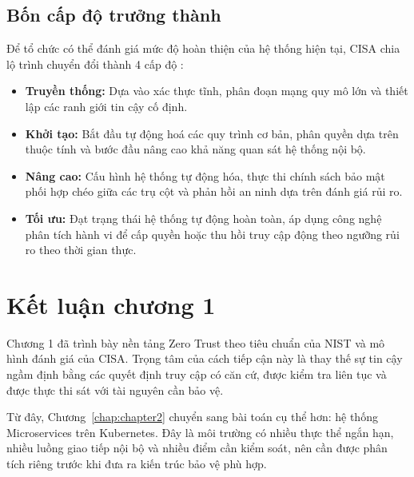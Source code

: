 \subsection{Bốn cấp độ trưởng thành}

Để tổ chức có thể đánh giá mức độ hoàn thiện của hệ thống hiện tại, CISA chia lộ trình chuyển đổi thành 4 cấp độ \parencite{cisa_ztmm2023}:
\begin{itemize}[itemsep=6pt, parsep=0pt]
    \item \textbf{Truyền thống:} Dựa vào xác thực tĩnh, phân đoạn mạng quy mô lớn và thiết lập các ranh giới tin cậy cố định.
    \item \textbf{Khởi tạo:} Bắt đầu tự động hoá các quy trình cơ bản, phân quyền dựa trên thuộc tính và bước đầu nâng cao khả năng quan sát hệ thống nội bộ.
    \item \textbf{Nâng cao:} Cấu hình hệ thống tự động hóa, thực thi chính sách bảo mật phối hợp chéo giữa các trụ cột và phản hồi an ninh dựa trên đánh giá rủi ro.
    \item \textbf{Tối ưu:} Đạt trạng thái hệ thống tự động hoàn toàn, áp dụng công nghệ phân tích hành vi để cấp quyền hoặc thu hồi truy cập động theo ngưỡng rủi ro theo thời gian thực.
\end{itemize}


\section*{Kết luận chương 1}

Chương 1 đã trình bày nền tảng Zero Trust theo tiêu chuẩn của NIST và mô hình đánh giá của CISA. Trọng tâm của cách tiếp cận này là thay thế sự tin cậy ngầm định bằng các quyết định truy cập có căn cứ, được kiểm tra liên tục và được thực thi sát với tài nguyên cần bảo vệ.

Từ đây, Chương~\ref{chap:chapter2} chuyển sang bài toán cụ thể hơn: hệ thống Microservices trên Kubernetes. Đây là môi trường có nhiều thực thể ngắn hạn, nhiều luồng giao tiếp nội bộ và nhiều điểm cần kiểm soát, nên cần được phân tích riêng trước khi đưa ra kiến trúc bảo vệ phù hợp.
